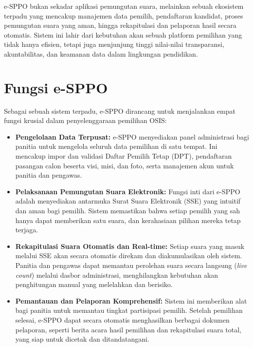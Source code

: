 e-SPPO bukan sekadar aplikasi pemungutan suara, melainkan sebuah ekosistem terpadu yang mencakup manajemen data pemilih, pendaftaran kandidat, proses pemungutan suara yang aman, hingga rekapitulasi dan pelaporan hasil secara otomatis. Sistem ini lahir dari kebutuhan akan sebuah platform pemilihan yang tidak hanya efisien, tetapi juga menjunjung tinggi nilai-nilai transparansi, akuntabilitas, dan keamanan data dalam lingkungan pendidikan.

\section{Fungsi e-SPPO}
\label{sec:fungsi_esppo}
Sebagai sebuah sistem terpadu, e-SPPO dirancang untuk menjalankan empat fungsi krusial dalam penyelenggaraan pemilihan OSIS:
\begin{itemize}
	\item \textbf{Pengelolaan Data Terpusat:} e-SPPO menyediakan panel administrasi bagi panitia untuk mengelola seluruh data pemilihan di satu tempat. Ini mencakup impor dan validasi Daftar Pemilih Tetap (DPT), pendaftaran pasangan calon beserta visi, misi, dan foto, serta manajemen akun untuk panitia dan pengawas.
	\item \textbf{Pelaksanaan Pemungutan Suara Elektronik:} Fungsi inti dari e-SPPO adalah menyediakan antarmuka Surat Suara Elektronik (SSE) yang intuitif dan aman bagi pemilih. Sistem memastikan bahwa setiap pemilih yang sah hanya dapat memberikan satu suara, dan kerahasiaan pilihan mereka tetap terjaga.
	\item \textbf{Rekapitulasi Suara Otomatis dan Real-time:} Setiap suara yang masuk melalui SSE akan secara otomatis direkam dan diakumulasikan oleh sistem. Panitia dan pengawas dapat memantau perolehan suara secara langsung (\textit{live count}) melalui dasbor administrasi, menghilangkan kebutuhan akan penghitungan manual yang melelahkan dan berisiko.
	\item \textbf{Pemantauan dan Pelaporan Komprehensif:} Sistem ini memberikan alat bagi panitia untuk memantau tingkat partisipasi pemilih. Setelah pemilihan selesai, e-SPPO dapat secara otomatis menghasilkan berbagai dokumen pelaporan, seperti berita acara hasil pemilihan dan rekapitulasi suara total, yang siap untuk dicetak dan ditandatangani.
\end{itemize}

